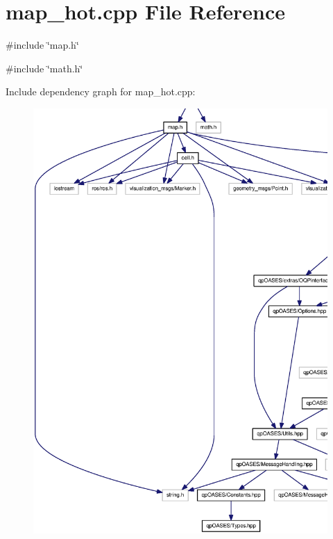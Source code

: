 \section{map\_\-hot.cpp File Reference}
\label{map__hot_8cpp}
{\ttfamily \#include \char`\"{}map.h\char`\"{}}\par
{\ttfamily \#include \char`\"{}math.h\char`\"{}}\par
Include dependency graph for map\_\-hot.cpp:
\nopagebreak
\begin{figure}[H]
\begin{center}
\leavevmode
\includegraphics[width=400pt]{map__hot_8cpp__incl}
\end{center}
\end{figure}
